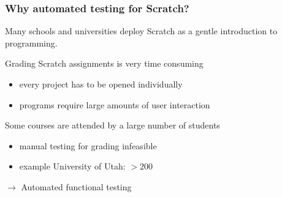 \begin{frame}\frametitle{Why automated testing for Scratch?}
    Many schools and universities deploy Scratch as a gentle introduction to programming.

    \pause
    \bigskip

    Grading Scratch assignments is very \textcolor{upfim}{time consuming}
    \begin{itemize}
        \item every project has to be opened individually
        \item programs require large amounts of \textcolor{upfim}{user interaction}
    \end{itemize}

    \pause
    \bigskip

    Some courses are attended by a \textcolor{upfim}{large number of students}
    \begin{itemize}
        \item manual testing for grading infeasible
        \item example University of Utah: $> 200$~\cite{itch}
    \end{itemize}

    \bigskip

    $\rightarrow$ Automated functional testing
%
%
\end{frame}
